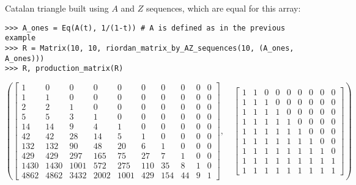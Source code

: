 \begin{example}
Catalan triangle built using $A$ and $Z$ sequences, which are equal for this array:
\begin{verbatim}
>>> A_ones = Eq(A(t), 1/(1-t)) # A is defined as in the previous example
>>> R = Matrix(10, 10, riordan_matrix_by_AZ_sequences(10, (A_ones, A_ones)))
>>> R, production_matrix(R)
\end{verbatim}
\begin{displaymath}
\left ( \left[\begin{matrix}1 & 0 & 0 & 0 & 0 & 0 & 0 & 0 & 0 & 0\\1 & 1 & 0 & 0 & 0 & 0 & 0 & 0 & 0 & 0\\2 & 2 & 1 & 0 & 0 & 0 & 0 & 0 & 0 & 0\\5 & 5 & 3 & 1 & 0 & 0 & 0 & 0 & 0 & 0\\14 & 14 & 9 & 4 & 1 & 0 & 0 & 0 & 0 & 0\\42 & 42 & 28 & 14 & 5 & 1 & 0 & 0 & 0 & 0\\132 & 132 & 90 & 48 & 20 & 6 & 1 & 0 & 0 & 0\\429 & 429 & 297 & 165 & 75 & 27 & 7 & 1 & 0 & 0\\1430 & 1430 & 1001 & 572 & 275 & 110 & 35 & 8 & 1 & 0\\4862 & 4862 & 3432 & 2002 & 1001 & 429 & 154 & 44 & 9 & 1\end{matrix}\right], \quad \left[\begin{matrix}1 & 1 & 0 & 0 & 0 & 0 & 0 & 0 & 0\\1 & 1 & 1 & 0 & 0 & 0 & 0 & 0 & 0\\1 & 1 & 1 & 1 & 0 & 0 & 0 & 0 & 0\\1 & 1 & 1 & 1 & 1 & 0 & 0 & 0 & 0\\1 & 1 & 1 & 1 & 1 & 1 & 0 & 0 & 0\\1 & 1 & 1 & 1 & 1 & 1 & 1 & 0 & 0\\1 & 1 & 1 & 1 & 1 & 1 & 1 & 1 & 0\\1 & 1 & 1 & 1 & 1 & 1 & 1 & 1 & 1\\1 & 1 & 1 & 1 & 1 & 1 & 1 & 1 & 1\end{matrix}\right]\right )
\end{displaymath}
\end{example}



